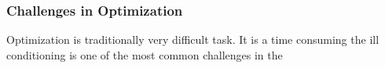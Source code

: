 \subsubsection{Challenges in Optimization}

Optimization is traditionally very difficult task. It is a time consuming 
the ill conditioning is one of the most common challenges in the 
